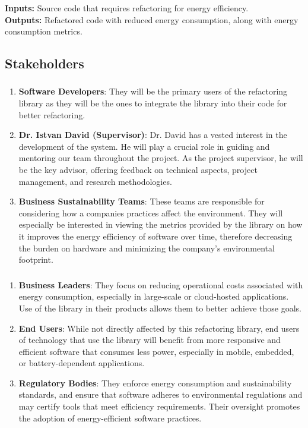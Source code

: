 \documentclass{article}
\begin{document}
\textbf{Inputs:} Source code that requires refactoring for energy efficiency. \\
\textbf{Outputs:} Refactored code with reduced energy consumption, along with energy consumption metrics.

\subsection{Stakeholders}
\subsubsection*{\color{blue}{Direct Stakeholders}}
\begin{enumerate}

    \item \textbf{Software Developers}: They will be the primary users of the refactoring library as they will be the ones to integrate the library into their code for better refactoring.
    \item \textbf{Dr. Istvan David (Supervisor)}: Dr. David has a vested interest in the development of the system. He will play a crucial role in guiding and mentoring our team throughout the project. As the project supervisor, he will be the key advisor, offering feedback on technical aspects, project management, and research methodologies. 
    \item \textbf{Business Sustainability Teams}: These teams are responsible for considering how a companies practices affect the environment. They will especially be interested in viewing the metrics provided by the library on how it improves the energy efficiency of software over time, therefore decreasing the burden on hardware and minimizing the company's environmental footprint.

\end{enumerate}

\subsubsection*{\color{blue}{Indirect Stakeholders}}
\begin{enumerate}

    \item \textbf{Business Leaders}: They focus on reducing operational costs associated with energy consumption, especially in large-scale or cloud-hosted applications. Use of the library in their products allows them to better achieve those goals. 
    \item \textbf{End Users}: While not directly affected by this refactoring library, end users of technology that use the library will benefit from more responsive and efficient software that consumes less power, especially in mobile, embedded, or battery-dependent applications. 
    \item \textbf{Regulatory Bodies}: They enforce energy consumption and sustainability standards, and ensure that software adheres to environmental regulations and may certify tools that meet efficiency requirements. Their oversight promotes the adoption of energy-efficient software practices.

\end{enumerate}
\end{document}
